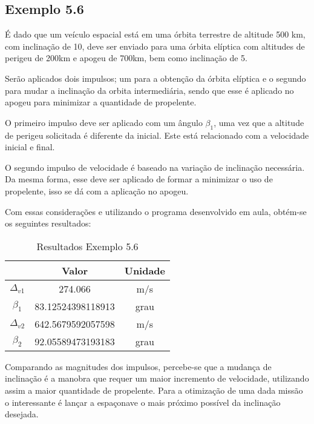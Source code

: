 \subsection{Exemplo 5.6}

\par É dado que um veículo espacial está em uma órbita terrestre de altitude 500 km, com inclinação de 10\degree , deve ser enviado para uma órbita elíptica com altitudes de perigeu de 200km e apogeu de 700km, bem como inclinação de 5\degree. 
\par Serão aplicados dois impulsos; um para a obtenção da órbita elíptica e o segundo para mudar a inclinação da orbita intermediária, sendo que esse é aplicado no apogeu para minimizar a quantidade de propelente. 
\par O primeiro impulso deve ser aplicado com um ângulo $\beta_1$, uma vez que a altitude de perigeu solicitada é diferente da inicial. Este está relacionado com a velocidade inicial e final.

\par O segundo impulso de velocidade é baseado na variação de inclinação necessária. Da mesma forma, esse deve ser aplicado de formar a minimizar o uso de propelente, isso se dá com a aplicação no apogeu. 

\par Com essas considerações e utilizando o programa desenvolvido em aula, obtém-se os seguintes resultados:

\begin{table}[H]
\centering
\caption{Resultados Exemplo 5.6}
\label{ex56}
\begin{tabular}{|c|c|c|}
\hline
                         & Valor             & Unidade \\ \hline
$\Delta_{v1}$ & 274.066           & m/s     \\ \hline
$\beta_1$                   & 83.12524398118913 & grau    \\ \hline
$\Delta_{v2}$ & 642.5679592057598 & m/s    \\ \hline
$\beta_2$                   & 92.05589473193183 & grau    \\ \hline
\end{tabular}%
\end{table}

\par Comparando as magnitudes dos impulsos, percebe-se que a mudança de inclinação é a manobra que requer um maior incremento de velocidade, utilizando assim a maior quantidade de propelente. Para a otimização de uma dada missão o interessante é lançar a espaçonave o mais próximo possível da inclinação desejada.

